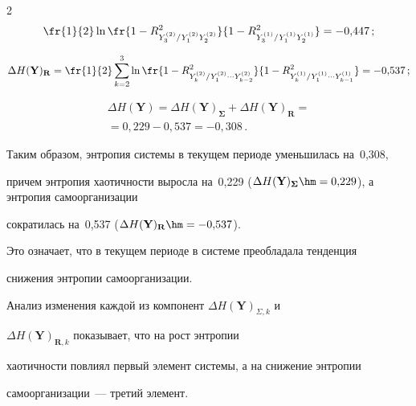 \begin{multicols}{2}
  $$

  \fr{1}{2}\ln \fr{1-R^2_{Y_3^{(2)}/Y_1^{(2)}Y_2^{(2)}}} 

  {1-R^2_{Y_3^{(1)}/Y_1^{(1)}Y_2^{(1)}}} =-0{,}447\,;

  $$

  $$

  \Delta H(\mathbf{Y})_{\mathbf{R}} =\fr{1}{2}\sum\limits_{k=2}^3 \ln 

  \fr{1-R^2_{Y_k^{(2)}/Y_1^{(2)}\cdots 

  Y_{k-2}^{(2)}}}{1-R^2_{Y_k^{(1)}/Y_1^{(1)}\cdots Y_{k-1}^{(1)}}} =

  -0{,}537\,;

  $$

 

 \vspace*{-12pt}

 

 \noindent

 \begin{multline*}

  \Delta H(\mathbf{Y}) =  \Delta H(\mathbf{Y})_{\boldsymbol{\Sigma}} +\Delta 

H(\mathbf{Y})_{\mathbf{R}} ={}\\

{}=0{,}229-0{,}537=-0{,}308\,.

  \end{multline*}

  

  Таким образом, энтропия системы в текущем периоде уменьшилась на~0,308, 

причем энтропия хаотичности выросла на~0,229 ($\Delta 

H(\mathbf{Y})_{\boldsymbol{\Sigma}}\hm=0{,}229$), а энтропия самоорганизации 

сократилась на~0,537 ($\Delta H(\mathbf{Y})_{\mathbf{R}}\hm= -0{,}537$). 

Это означает, что в текущем периоде в системе преобладала тенденция 

снижения энтропии самоорганизации.

  

  Анализ изменения каждой из компонент $\Delta H(\mathbf{Y})_{\Sigma,k}$ и 

$\Delta H(\mathbf{Y})_{\mathbf{R},k}$ показывает, что на рост энтропии 

хаотичности повлиял первый элемент сис\-те\-мы, а на снижение энтропии 

самоорганизации~--- третий элемент.


\end{multicols}
